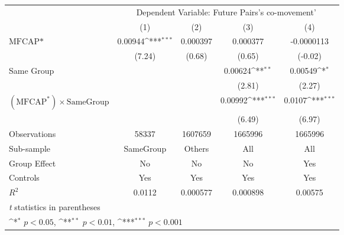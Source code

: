 {
\def\sym#1{\ifmmode^{#1}\else\(^{#1}\)\fi}
\begin{tabular}{l*{4}{c}}
\hline\hline
                &\multicolumn{4}{c}{Dependent Variable: Future Pairs's co-movement'}        \\\cmidrule(lr){2-5}
                &\multicolumn{1}{c}{(1)}         &\multicolumn{1}{c}{(2)}         &\multicolumn{1}{c}{(3)}         &\multicolumn{1}{c}{(4)}         \\
\hline
$ \text{MFCAP*} $&  0.00944\sym{***}& 0.000397         & 0.000377         &-0.0000113         \\
                &   (7.24)         &   (0.68)         &   (0.65)         &  (-0.02)         \\
[1em]
Same Group      &                  &                  &  0.00624\sym{**} &  0.00549\sym{*}  \\
                &                  &                  &   (2.81)         &   (2.27)         \\
[1em]
 $ (\text{MFCAP}^*) \times {\text{SameGroup} }  $ &                  &                  &  0.00992\sym{***}&   0.0107\sym{***}\\
                &                  &                  &   (6.49)         &   (6.97)         \\
\hline
Observations    &    58337         &  1607659         &  1665996         &  1665996         \\
Sub-sample      &SameGroup         &   Others         &      All         &      All         \\
Group Effect    &       No         &       No         &       No         &      Yes         \\
Controls        &      Yes         &      Yes         &      Yes         &      Yes         \\
$ R^2 $         &   0.0112         & 0.000577         & 0.000898         &  0.00575         \\
\hline\hline
\multicolumn{5}{l}{\footnotesize \textit{t} statistics in parentheses}\\
\multicolumn{5}{l}{\footnotesize \sym{*} \(p<0.05\), \sym{**} \(p<0.01\), \sym{***} \(p<0.001\)}\\
\end{tabular}
}
